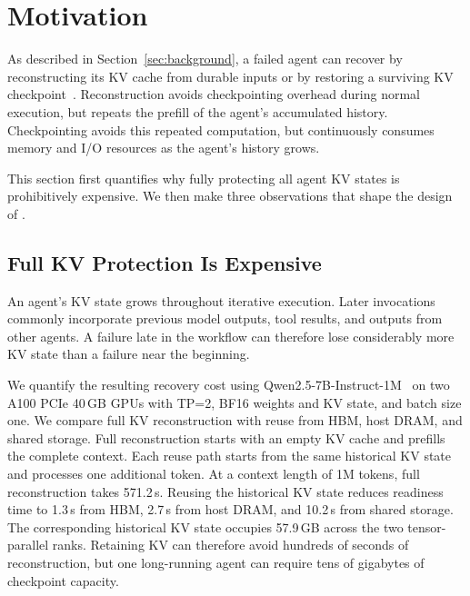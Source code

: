 \section{Motivation} \label{sec:motivation} 


As described in Section~\ref{sec:background}, a failed agent can recover by reconstructing its KV cache from durable inputs or by restoring a surviving KV checkpoint~\cite{strati2024dejavu,cao2026lumen}. Reconstruction avoids checkpointing overhead during normal execution, but repeats the prefill of the agent's accumulated history. Checkpointing avoids this repeated computation, but continuously consumes memory and I/O resources as the agent's history grows.

This section first quantifies why fully protecting all agent KV states is prohibitively expensive. We then make three observations that shape the design of \system. 

\subsection{Full KV Protection Is Expensive} \label{sec:motivation:cost} 

An agent's KV state grows throughout iterative execution. Later invocations commonly incorporate previous model outputs, tool results, and outputs from other agents. A failure late in the workflow can therefore lose considerably more KV state than a failure near the beginning.


We quantify the resulting recovery cost using Qwen2.5-7B-Instruct-1M~\cite{qwen2025qwen25oneM,jiang2024minference} on two A100 PCIe 40\,GB GPUs with TP=2, BF16 weights and KV state, and batch size one. %
We compare full KV reconstruction with reuse from HBM, host DRAM, and shared storage. Full reconstruction starts with an empty KV cache and prefills the complete context. Each reuse path starts from the same historical KV state and processes one additional token. 
%
At a context length of 1M tokens, full reconstruction takes 571.2\,s. Reusing the historical KV state reduces readiness time to 1.3\,s from HBM, 2.7\,s from host DRAM, and 10.2\,s from shared storage. The corresponding historical KV state occupies 57.9\,GB across the two tensor-parallel ranks. Retaining KV can therefore avoid hundreds of seconds of reconstruction, but one long-running agent can require tens of gigabytes of checkpoint capacity. 


